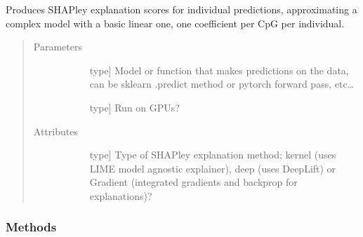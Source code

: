 \documentclass[letterpaper,10pt,english]{sphinxmanual}
\begin{document}
\begin{fulllineitems}
\label{\detokenize{index:methylnet.interpretation_classes.CpGExplainer}}
Produces SHAPley explanation scores for individual predictions, approximating a complex model with a basic linear one, one coefficient per CpG per individual.
\begin{quote}\begin{description}
\item[{Parameters}] \leavevmode\begin{description}
\item[{}] \leavevmode{[}type{]}
Model or function that makes predictions on the data, can be sklearn .predict method or pytorch forward pass, etc…

\item[{}] \leavevmode{[}type{]}
Run on GPUs?

\end{description}

\item[{Attributes}] \leavevmode\begin{description}
\item[{}] \leavevmode{[}type{]}
Type of SHAPley explanation method; kernel (uses LIME model agnostic explainer), deep (uses DeepLift) or Gradient (integrated gradients and backprop for explanations)?

\item[{}] \leavevmode
\item[{}] \leavevmode
\end{description}

\end{description}\end{quote}
\subsubsection*{Methods}


\begin{savenotes}\sphinxatlongtablestart\begin{longtable}{}
\hline

\endfirsthead


\end{longtable}
\end{savenotes}
\end{fulllineitems}
\end{document}
